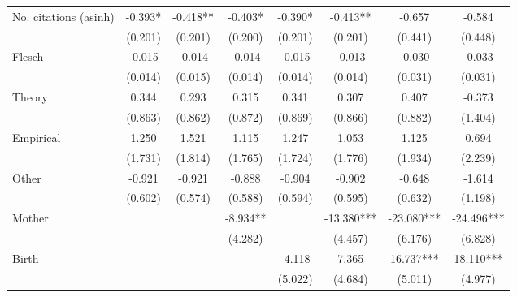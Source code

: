 \begin{table}
\begin{adjustwidth}{-0.085cm}{}
\begin{threeparttable}
\begin{tabular}{p{2.64cm}SSSSSSS}
            No. citations (asinh)         &      -0.393*  &      -0.418** &      -0.403*  &      -0.390*  &      -0.413** &      -0.657   &      -0.584   \\
                                          &     (0.201)   &     (0.201)   &     (0.200)   &     (0.201)   &     (0.201)   &     (0.441)   &     (0.448)   \\
            Flesch                        &      -0.015   &      -0.014   &      -0.014   &      -0.015   &      -0.013   &      -0.030   &      -0.033   \\
                                          &     (0.014)   &     (0.015)   &     (0.014)   &     (0.014)   &     (0.014)   &     (0.031)   &     (0.031)   \\
            Theory                        &       0.344   &       0.293   &       0.315   &       0.341   &       0.307   &       0.407   &      -0.373   \\
                                          &     (0.863)   &     (0.862)   &     (0.872)   &     (0.869)   &     (0.866)   &     (0.882)   &     (1.404)   \\
            Empirical                     &       1.250   &       1.521   &       1.115   &       1.247   &       1.053   &       1.125   &       0.694   \\
                                          &     (1.731)   &     (1.814)   &     (1.765)   &     (1.724)   &     (1.776)   &     (1.934)   &     (2.239)   \\
            Other                         &      -0.921   &      -0.921   &      -0.888   &      -0.904   &      -0.902   &      -0.648   &      -1.614   \\
                                          &     (0.602)   &     (0.574)   &     (0.588)   &     (0.594)   &     (0.595)   &     (0.632)   &     (1.198)   \\
            Mother                        &               &               &      -8.934** &               &     -13.380***&     -23.080***&     -24.496***\\
                                          &               &               &     (4.282)   &               &     (4.457)   &     (6.176)   &     (6.828)   \\
            Birth                         &               &               &               &      -4.118   &       7.365   &      16.737***&      18.110***\\
                                          &               &               &               &     (5.022)   &     (4.684)   &     (5.011)   &     (4.977)   \\

\end{tabular}
\end{threeparttable}
\end{adjustwidth}
\end{table}
